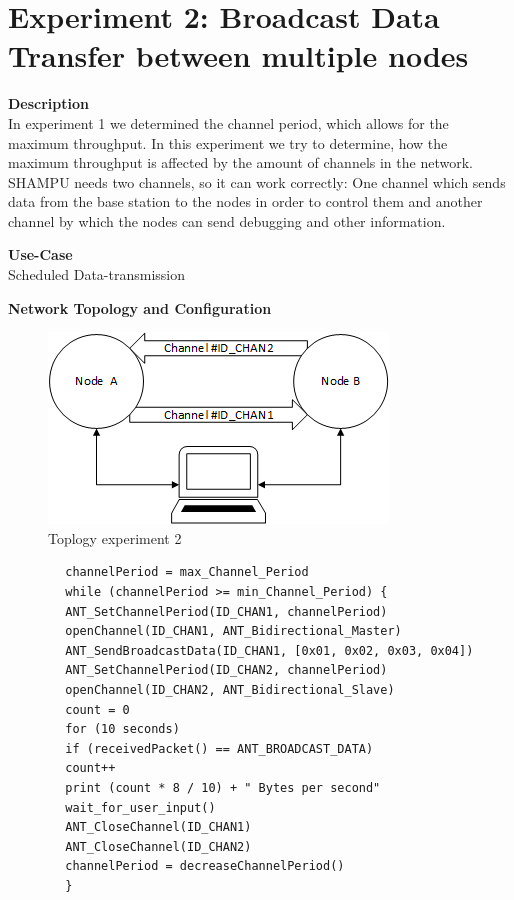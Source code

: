 \section{Experiment 2: Broadcast Data Transfer between multiple nodes}
\begin{description} 
	\item{\textbf{Description}} \hfill \\ In experiment 1 we determined the channel period, which allows for the maximum throughput. In this experiment we try to determine, how the maximum throughput is affected by the amount of channels in the network. SHAMPU needs two channels, so it can work correctly: One channel which sends data from the base station to the nodes in order to control them and another channel by which the nodes can send debugging and other information.
	\item{\textbf{Use-Case}} \hfill \\ Scheduled Data-transmission	
	\item{\textbf{Network Topology and Configuration}} \hfill
	\begin{figure}[h]
		\centering
		\includegraphics[scale=1]{content/images/exp2_topo.png}
		\caption{Toplogy experiment 2}
	\end{figure}
	\begin{code}[h]
		\begin{verbatim}
		channelPeriod = max_Channel_Period
		while (channelPeriod >= min_Channel_Period) {
		ANT_SetChannelPeriod(ID_CHAN1, channelPeriod)
		openChannel(ID_CHAN1, ANT_Bidirectional_Master)
		ANT_SendBroadcastData(ID_CHAN1, [0x01, 0x02, 0x03, 0x04])
		ANT_SetChannelPeriod(ID_CHAN2, channelPeriod)
		openChannel(ID_CHAN2, ANT_Bidirectional_Slave)
		count = 0
		for (10 seconds) 
		if (receivedPacket() == ANT_BROADCAST_DATA)
		count++			
		print (count * 8 / 10) + " Bytes per second"
		wait_for_user_input()
		ANT_CloseChannel(ID_CHAN1)
		ANT_CloseChannel(ID_CHAN2)
		channelPeriod = decreaseChannelPeriod()
		}
		\end{verbatim}
		\caption{Broadcast data transfer two channels (Master)}\label{lst:mExp2}
	\end{code}
	

\end{description}
